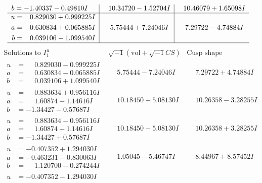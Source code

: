 \documentclass[1p]{elsarticle_modified}
\theoremstyle{definition}
\newcommand{\I}{\sqrt{-1}}
\begin{document}
$$\begin{array}{c|c|c}
\begin{aligned}
b &= -1.40337 - 0.49810 I\end{aligned}
 & \phantom{-}10.34720 - 1.52704 I & \phantom{-}10.46079 + 1.65098 I \\ \hline\begin{aligned}
u &= \phantom{-}0.829030 + 0.999225 I \\
a &= \phantom{-}0.630834 + 0.065885 I \\
b &= \phantom{-}0.039106 - 1.099540 I\end{aligned}
 & \phantom{-}5.75444 + 7.24046 I & \phantom{-}7.29722 - 4.74884 I\\
 \hline 
 \end{array}$$\newpage$$\begin{array}{c|c|c}  
\text{Solutions to }I^u_{1}& \I (\text{vol} + \sqrt{-1}CS) & \text{Cusp shape}\\
 \hline 
\begin{aligned}
u &= \phantom{-}0.829030 - 0.999225 I \\
a &= \phantom{-}0.630834 - 0.065885 I \\
b &= \phantom{-}0.039106 + 1.099540 I\end{aligned}
 & \phantom{-}5.75444 - 7.24046 I & \phantom{-}7.29722 + 4.74884 I \\ \hline\begin{aligned}
u &= \phantom{-}0.883634 + 0.956116 I \\
a &= \phantom{-}1.60874 - 1.14616 I \\
b &= -1.34427 - 0.57687 I\end{aligned}
 & \phantom{-}10.18450 + 5.08130 I & \phantom{-}10.26358 - 3.28255 I \\ \hline\begin{aligned}
u &= \phantom{-}0.883634 - 0.956116 I \\
a &= \phantom{-}1.60874 + 1.14616 I \\
b &= -1.34427 + 0.57687 I\end{aligned}
 & \phantom{-}10.18450 - 5.08130 I & \phantom{-}10.26358 + 3.28255 I \\ \hline\begin{aligned}
u &= -0.407352 + 1.294030 I \\
a &= -0.463231 - 0.830063 I \\
b &= \phantom{-}1.120700 - 0.274244 I\end{aligned}
 & \phantom{-}1.05045 - 5.46747 I & \phantom{-}8.44967 + 8.57452 I \\ \hline\begin{aligned}
u &= -0.407352 - 1.294030 I \\

\end{aligned}
\end{array}$$
\end{document}
